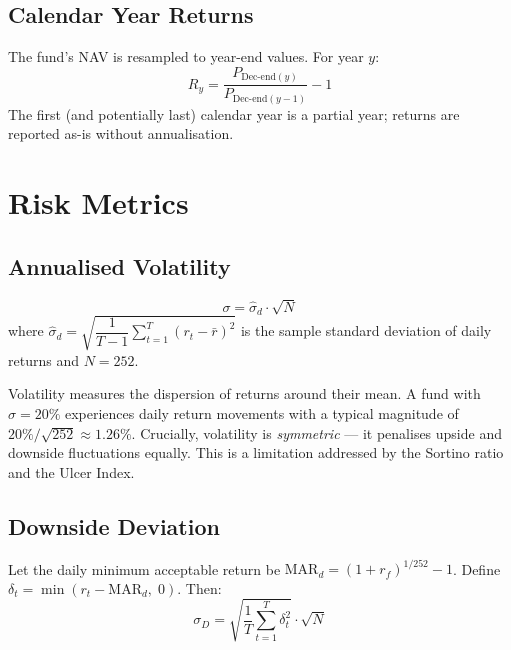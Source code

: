 \documentclass[12pt, a4paper]{article}
\newcommand{\rf}{r_f}
\begin{document}
\subsection{Calendar Year Returns}

The fund's NAV is resampled to year-end values.  For year $y$:
\[
  R_y = \frac{P_{\text{Dec-end}(y)}}{P_{\text{Dec-end}(y-1)}} - 1
\]
The first (and potentially last) calendar year is a partial year; returns
are reported as-is without annualisation.

\section{Risk Metrics}

\subsection{Annualised Volatility}

\begin{definition}
\[
  \sigma = \hat{\sigma}_d \cdot \sqrt{N}
\]
where $\hat{\sigma}_d = \sqrt{\dfrac{1}{T-1}\sum_{t=1}^{T}(r_t - \bar{r})^2}$
is the sample standard deviation of daily returns and $N = 252$.
\end{definition}

\begin{interpretation}[Volatility]
Volatility measures the dispersion of returns around their mean.  A fund
with $\sigma = 20\%$ experiences daily return movements with a typical
magnitude of $20\%/\sqrt{252} \approx 1.26\%$.  Crucially, volatility is
\emph{symmetric} — it penalises upside and downside fluctuations equally.
This is a limitation addressed by the Sortino ratio and the Ulcer Index.
\end{interpretation}

\subsection{Downside Deviation}

\begin{definition}
Let the daily minimum acceptable return be
$\text{MAR}_d = (1 + \rf)^{1/252} - 1$.  Define
$\delta_t = \min(r_t - \text{MAR}_d,\; 0)$.  Then:
\[
  \sigma_D = \sqrt{\frac{1}{T}\sum_{t=1}^{T} \delta_t^2} \cdot \sqrt{N}
\]
\end{definition}
\end{document}
